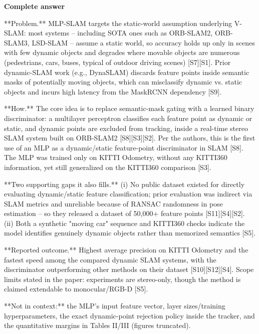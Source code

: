 \documentclass[10pt]{article}
\begin{document}
\textbf{Complete answer}
\begin{AnswerText}
**Problem.** MLP-SLAM targets the static-world assumption underlying V-SLAM: most systems -- including SOTA ones such as ORB-SLAM2, ORB-SLAM3, LSD-SLAM -- assume a static world, so accuracy holds up only in scenes with few dynamic objects and degrades where movable objects are numerous (pedestrians, cars, buses, typical of outdoor driving scenes) [S7][S1]. Prior dynamic-SLAM work (e.g., DynaSLAM) discards feature points inside semantic masks of potentially moving objects, which can misclassify dynamic vs. static objects and incurs high latency from the MaskRCNN dependency [S9].

**How.** The core idea is to replace semantic-mask gating with a learned binary discriminator: a multilayer perceptron classifies each feature point as dynamic or static, and dynamic points are excluded from tracking, inside a real-time stereo SLAM system built on ORB-SLAM2 [S8][S3][S2]. Per the authors, this is the first use of an MLP as a dynamic/static feature-point discriminator in SLAM [S8]. The MLP was trained only on KITTI Odometry, without any KITTI360 information, yet still generalized on the KITTI360 comparison [S3].

**Two supporting gaps it also fills.** (i) No public dataset existed for directly evaluating dynamic/static feature classification; prior evaluation was indirect via SLAM metrics and unreliable because of RANSAC randomness in pose estimation -- so they released a dataset of 50,000+ feature points [S11][S4][S2]. (ii) Both a synthetic "moving car" sequence and KITTI360 checks indicate the model identifies genuinely dynamic objects rather than memorized semantics [S5].

**Reported outcome.** Highest average precision on KITTI Odometry and the fastest speed among the compared dynamic SLAM systems, with the discriminator outperforming other methods on their dataset [S10][S12][S4]. Scope limits stated in the paper: experiments are stereo-only, though the method is claimed extendable to monocular/RGB-D [S5].

**Not in context:** the MLP's input feature vector, layer sizes/training hyperparameters, the exact dynamic-point rejection policy inside the tracker, and the quantitative margins in Tables II/III (figures truncated).
\end{AnswerText}
\end{document}
